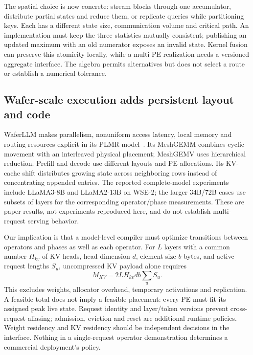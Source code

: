 \documentclass[final,3p,times,authoryear]{elsarticle}
\begin{document}
The spatial choice is now concrete: stream blocks through one accumulator, distribute partial states and reduce them, or replicate queries while partitioning keys. Each has a different state size, communication volume and critical path. An implementation must keep the three statistics mutually consistent; publishing an updated maximum with an old numerator exposes an invalid state. Kernel fusion can preserve this atomicity locally, while a multi-PE realization needs a versioned aggregate interface. The algebra permits alternatives but does not select a route or establish a numerical tolerance.

\subsection{Wafer-scale execution adds persistent layout and code}
WaferLLM makes parallelism, nonuniform access latency, local memory and routing resources explicit in its PLMR model~\citep{he2025}. Its MeshGEMM combines cyclic movement with an interleaved physical placement; MeshGEMV uses hierarchical reduction. Prefill and decode use different layouts and PE allocations. Its KV-cache shift distributes growing state across neighboring rows instead of concentrating appended entries. The reported complete-model experiments include LLaMA3-8B and LLaMA2-13B on WSE-2; the larger 34B/72B cases use subsets of layers for the corresponding operator/phase measurements. These are paper results, not experiments reproduced here, and do not establish multi-request serving behavior.

Our implication is that a model-level compiler must optimize transitions between operators and phases as well as each operator. For $L$ layers with a common number $H_{kv}$ of KV heads, head dimension $d$, element size $b$ bytes, and active request lengths $S_u$, uncompressed KV payload alone requires
\begin{equation}\label{eq:kv}
 M_{KV}=2LH_{kv}db\sum_u S_u.
\end{equation}
This excludes weights, allocator overhead, temporary activations and replication. A feasible total does not imply a feasible placement: every PE must fit its assigned peak live state. Request identity and layer/token versions prevent cross-request aliasing; admission, eviction and reset are additional runtime policies. Weight residency and KV residency should be independent decisions in the interface. Nothing in a single-request operator demonstration determines a commercial deployment's policy.
\end{document}
